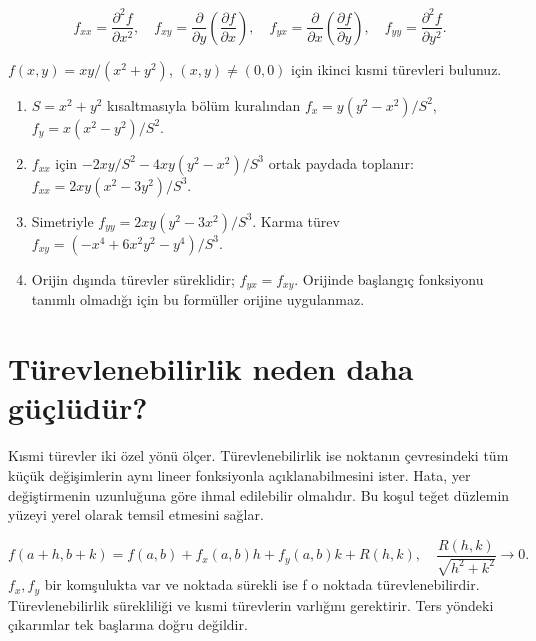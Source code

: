 {\small\[
f_{xx}=\frac{\partial^2 f}{\partial x^2},\quad f_{xy}=\frac{\partial}{\partial y}\left(\frac{\partial f}{\partial x}\right),\quad f_{yx}=\frac{\partial}{\partial x}\left(\frac{\partial f}{\partial y}\right),\quad f_{yy}=\frac{\partial^2f}{\partial y^2}.
\]}
\begin{tcolorbox}[title={Örnek 5.3 | Dersteki rasyonel fonksiyonun ikinci türevleri},colframe=accent]\(f(x,y)=xy/(x^2+y^2)\), \((x,y)\ne(0,0)\) için ikinci kısmi türevleri bulunuz.
\par{}\end{tcolorbox}
\begin{tcolorbox}[title={Adım adım çözüm},colback=green!3!white,colframe=green]\begin{enumerate}
\item \(S=x^2+y^2\) kısaltmasıyla bölüm kuralından \(f_x=y(y^2-x^2)/S^2\), \(f_y=x(x^2-y^2)/S^2\).
\item \(f_{xx}\) için \(-2xy/S^2-4xy(y^2-x^2)/S^3\) ortak paydada toplanır: \(f_{xx}=2xy(x^2-3y^2)/S^3\).
\item Simetriyle \(f_{yy}=2xy(y^2-3x^2)/S^3\). Karma türev \(f_{xy}=(-x^4+6x^2y^2-y^4)/S^3\).
\item Orijin dışında türevler süreklidir; \(f_{yx}=f_{xy}\). Orijinde başlangıç fonksiyonu tanımlı olmadığı için bu formüller orijine uygulanmaz.
\end{enumerate}\end{tcolorbox}
\section{Türevlenebilirlik neden daha güçlüdür?}
Kısmi türevler iki özel yönü ölçer. Türevlenebilirlik ise noktanın çevresindeki tüm küçük değişimlerin aynı lineer fonksiyonla açıklanabilmesini ister. Hata, yer değiştirmenin uzunluğuna göre ihmal edilebilir olmalıdır. Bu koşul teğet düzlemin yüzeyi yerel olarak temsil etmesini sağlar.


{\small\[
f(a+h,b+k)=f(a,b)+f_x(a,b)h+f_y(a,b)k+R(h,k),\quad\frac{R(h,k)}{\sqrt{h^2+k^2}}\to0.
\]}
\(f_x,f_y\) bir komşulukta var ve noktada sürekli ise f o noktada türevlenebilirdir. Türevlenebilirlik sürekliliği ve kısmi türevlerin varlığını gerektirir. Ters yöndeki çıkarımlar tek başlarına doğru değildir.

